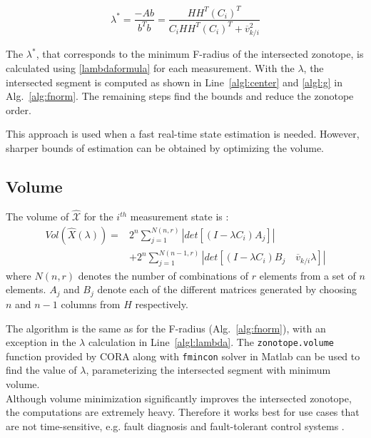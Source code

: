 \begin{equation}
\label{lambdaformula}
\lambda^* = \frac{-Ab }{b^Tb}  = \frac{HH^T(C_i)^T}{C_i HH^T(C_i)^T + \overline{v}_{k/i}^2} 
\end{equation}

The $\lambda^*$, that corresponds to the minimum F-radius of the intersected zonotope, is calculated using \eqref{lambdaformula} for each measurement. With the $\lambda$, the intersected segment is computed as shown in Line~\ref{algl:center} and \ref{algl:g} in Alg.~\ref{alg:fnorm}. The remaining steps find the bounds and reduce the zonotope order. 

This approach is used when a fast real-time state estimation is needed. However, sharper bounds of estimation can be obtained by optimizing the volume.

\subsection{Volume}
The volume of $\mathcal{\hat{X}}$ for the $i^{th}$ measurement state is \cite{Alamo2005}:
\begin{equation}
\label{volumeformula}
\begin{split}
Vol(\hat{X}(\lambda))=& 2^n \sum^{N(n,r)}_{j=1} |det[(I - \lambda C_i)A_j]|\\
&+ 2^n \sum^{N(n-1,r)}_{j=1} |det[(I- \lambda C_i)B_j\quad \overline{v}_{k/i}\lambda]|
\end{split}
\end{equation}
where $N(n,r)$ denotes the number of combinations of $r$ elements from a set of $n$ elements. $A_j$ and $B_j$ denote each of the different matrices generated by choosing $n$ and $n-1$ columns from $H$ respectively. 

The algorithm is the same as for the F-radius (Alg.~\ref{alg:fnorm}), with an exception in the $\lambda$ calculation in Line~\ref{algl:lambda}. The \texttt{zonotope.volume} function provided by CORA along with \texttt{fmincon} solver in Matlab\textsuperscript{\tiny\textregistered}  can be used to find the value of $\lambda$, parameterizing the intersected segment with minimum volume. \\
Although volume minimization significantly improves the intersected zonotope, the computations are extremely heavy. Therefore it works best for use cases that are not time-sensitive, e.g. fault diagnosis and fault-tolerant control systems \cite{Puig2010}. 

